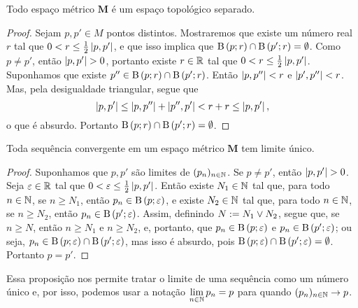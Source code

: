 \begin{proposition}
Todo espaço métrico $\bm M$ é um espaço topológico separado.
\end{proposition}
\begin{proof}
Sejam $p,p' \in M$ pontos distintos. Mostraremos que existe um número real $r$ tal que $0 < r \leq \frac{1}{2} \left\vert{p},{p'}\right\vert$, e que isso implica que $\mathrm{B}\left(p; r\right) \cap \mathrm{B}\left(p'; r\right) = \emptyset$. Como $p \neq p'$, então $\left\vert{p},{p'}\right\vert > 0$, portanto existe $r \in \mathbb{R}$ tal que $0 < r \leq \frac{1}{2} \left\vert{p},{p'}\right\vert$. Suponhamos que existe $p'' \in \mathrm{B}\left(p; r\right) \cap \mathrm{B}\left(p'; r\right)$. Então $\left\vert{p},{p''}\right\vert<r$ e $\left\vert{p'},{p''}\right\vert<r$. Mas, pela desigualdade triangular, segue que
	\begin{equation*}
	\left\vert{p},{p'}\right\vert \leq \left\vert{p},{p''}\right\vert + \left\vert{p''},{p'}\right\vert < r + r \leq \left\vert{p},{p'}\right\vert,
	\end{equation*}
o que é absurdo. Portanto $\mathrm{B}\left(p; r\right) \cap \mathrm{B}\left(p'; r\right) = \emptyset$.
\end{proof}

\begin{corollary}
Toda sequência convergente em um espaço métrico $\bm M$ tem limite único.
\end{corollary}
\begin{proof}
Suponhamos que $p,p'$ são limites de $(p_n)_{n \in \mathbb{N}}$. Se $p \neq p'$, então $\left\vert{p},{p'}\right\vert>0$. Seja $\varepsilon \in \mathbb{R}$ tal que $0 < \varepsilon \leq \frac{1}{2} \left\vert{p},{p'}\right\vert$. Então existe $N_1 \in \mathbb{N}$ tal que, para todo $n \in \mathbb{N}$, se $n \geq N_1$, então $p_n \in \mathrm{B}\left(p; \varepsilon\right)$, e existe $N_2 \in \mathbb{N}$ tal que, para todo $n \in \mathbb{N}$, se $n \geq N_2$, então $p_n \in \mathrm{B}\left(p'; \varepsilon\right)$. Assim, definindo $N := N_1 \mathbin{\vee} N_2$, segue que, se $n \geq N$, então $n \geq N_1$ e $n \geq N_2$, e, portanto, que $p_n \in \mathrm{B}\left(p; \varepsilon\right)$ e $p_n \in \mathrm{B}\left(p'; \varepsilon\right)$; ou seja, $p_n \in \mathrm{B}\left(p; \varepsilon\right) \cap \mathrm{B}\left(p'; \varepsilon\right)$, mas isso é absurdo, pois $\mathrm{B}\left(p; \varepsilon\right) \cap \mathrm{B}\left(p'; \varepsilon\right)=\emptyset$. Portanto $p=p'$.
\end{proof}

Essa proposição nos permite tratar o limite de uma sequência como um número único e, por isso, podemos usar a notação $\displaystyle\lim_{n \in \mathbb{N}} p_n = p$ para quando $(p_n)_{n \in \mathbb{N}} \rightarrow p$.

